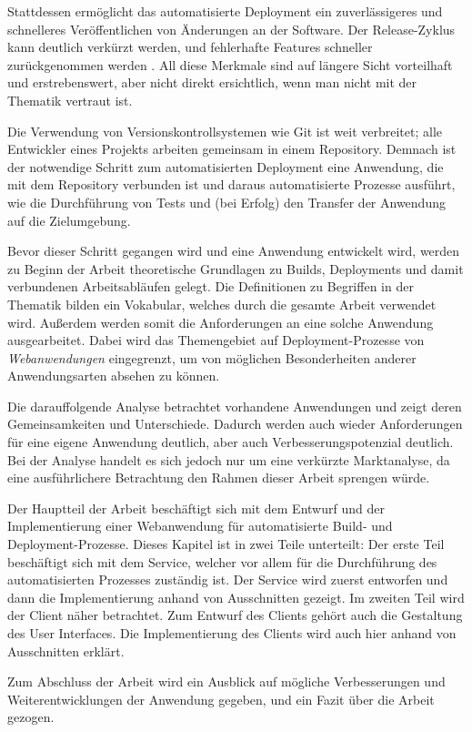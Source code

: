 Stattdessen ermöglicht das automatisierte Deployment ein zuverlässigeres und schnelleres Veröffentlichen von Änderungen an der Software. Der Release-Zyklus kann deutlich verkürzt werden, und fehlerhafte Features schneller zurückgenommen werden \citep[11f]{Humble2010}. All diese Merkmale sind auf längere Sicht vorteilhaft und erstrebenswert, aber nicht direkt ersichtlich, wenn man nicht mit der Thematik vertraut ist.

Die Verwendung von Versionskontrollsystemen wie Git ist weit verbreitet; alle Entwickler eines Projekts arbeiten gemeinsam in einem Repository. Demnach ist der notwendige Schritt zum automatisierten Deployment eine Anwendung, die mit dem Repository verbunden ist und daraus automatisierte Prozesse ausführt, wie die Durchführung von Tests und (bei Erfolg) den Transfer der Anwendung auf die Zielumgebung.

Bevor dieser Schritt gegangen wird und eine Anwendung entwickelt wird, werden zu Beginn der Arbeit  theoretische Grundlagen zu Builds, Deployments und damit verbundenen Arbeitsabläufen gelegt. Die Definitionen zu Begriffen in der Thematik bilden ein Vokabular, welches durch die gesamte Arbeit verwendet wird. Außerdem werden somit die Anforderungen an eine solche Anwendung ausgearbeitet. Dabei wird das Themengebiet auf Deployment-Prozesse von \emph{Webanwendungen} eingegrenzt, um von möglichen Besonderheiten anderer Anwendungsarten absehen zu können.

Die darauffolgende Analyse betrachtet vorhandene Anwendungen und zeigt deren Gemeinsamkeiten und Unterschiede. Dadurch werden auch wieder Anforderungen für eine eigene Anwendung deutlich, aber auch Verbesserungspotenzial deutlich. Bei der Analyse handelt es sich jedoch nur um eine verkürzte Marktanalyse, da eine ausführlichere Betrachtung den Rahmen dieser Arbeit sprengen würde.

Der Hauptteil der Arbeit beschäftigt sich mit dem Entwurf und der Implementierung einer Webanwendung für automatisierte Build- und De\-ploy\-ment-Prozesse. Dieses Kapitel ist in zwei Teile unterteilt: Der erste Teil beschäftigt sich mit dem Service, welcher vor allem für die Durchführung des automatisierten Prozesses zuständig ist. Der Service wird zuerst entworfen und dann die Implementierung anhand von Ausschnitten gezeigt. Im zweiten Teil wird der Client näher betrachtet. Zum Entwurf des Clients gehört auch die Gestaltung des User Interfaces. Die Implementierung des Clients wird auch hier anhand von Ausschnitten erklärt.

Zum Abschluss der Arbeit wird ein Ausblick auf mögliche Verbesserungen und Weiterentwicklungen der Anwendung gegeben, und ein Fazit über die Arbeit gezogen.
